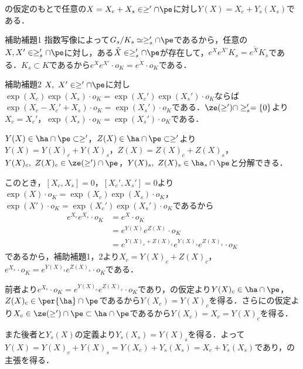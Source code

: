 \begin{lem}\label{lem:0117-decomp}
  の仮定のもとで任意の$X = X_c + X_s \in \ge'\cap\pe $に対し$Y(X) = X_c + Y_s(X_s) $である．
\end{lem}
\begin{npfwn}

  \leavevmode
  \begin{itembox}[l]{補助補題1}
    指数写像によって$G_s/K_s \simeq \ge_s'\cap \pe $であるから，任意の$X, X'\in \ge_{s}'\cap \pe $に対し，ある$\tilde{X}\in \ge_s'\cap \pe$が存在して，$e^{X}e^{X'}K_s = e^{\tilde{X}}K_s  $である．$K_s\subset K $であるから$e^{X}e^{X'}\cdot o_K = e^{\tilde{X}}\cdot o_K $である．
  \end{itembox}
  
  
  \begin{itembox}[l]{補助補題2}
    $X,\ X'\in \ge'\cap\pe $に対し$\exp(X_c)\exp(X_s)\cdot o_K = \exp(X_c')\exp(X_s')\cdot o_K $ならば$\exp(X_c-X_c'+X_s)\cdot o_K = \exp(X_s')\cdot o_K $である．$\ze(\ge')\cap \ge_s' = \{0\} $より$X_c = X_c' $，$\exp(X_s)\cdot o_K = \exp(X_s')\cdot o_K$である．
  \end{itembox}
  
  $Y(X)\in \ha\cap\pe\subset \ge' $，$Z(X)\in \ha\cap\pe\subset \ge' $より$Y(X) = Y(X)_c + Y(X)_s $，$Z(X) = Z(X)_c + Z(X)_s $，$Y(X)_c,\ Z(X)_c \in \ze(\ge')\cap\pe  $，$Y(X)_s,\ Z(X)_s\in \ha_s\cap\pe $と分解できる．

  このとき，$[X_c, X_s] = 0 $，$[X_c', X_s'] = 0$より$\exp(X)\cdot o_K = \exp(X_c)\exp(X_s)\cdot o_K $，$\exp(X')\cdot o_K = \exp(X_c')\exp(X_s')\cdot o_K $であるから
  \begin{align*}
    e^{X_c}e^{X_s}\cdot o_K &= e^{X}\cdot o_K \\
                            &= e^{Y(X)}e^{Z(X)}\cdot o_K\\
                            &= e^{Y(X)_c + Z(X)_c}e^{Y(X)_s}e^{Z(X)_s}\cdot o_K
  \end{align*}
  であるから，補助補題1，2より$X_c = Y(X)_c + Z(X)_c $，$e^{X_s}\cdot o_K = e^{Y(X)_s}e^{Z(X)_s}\cdot o_K $である．

  前者より$e^{X_c} \cdot o_K = e^{Y(X)_c}e^{Z(X)_c}\cdot o_K $であり，の仮定より$Y(X)_c \in \ha\cap \pe$，$  Z(X)_c \in \per{\ha}\cap \pe$であるから$Y(X_c) = Y(X)_c $を得る．さらにの仮定より$X_c\in \ze(\ge')\cap \pe\subset \ha \cap \pe $であるから$Y(X_c) = X_c = Y(X)_c $を得る．

  また後者と$Y_s(X) $の定義より$Y_s(X_s) = Y(X)_s $を得る．よって$Y(X) = Y(X)_c + Y(X)_s = Y(X_c) + Y_s(X_s) = X_c + Y_s(X_s) $であり，の主張を得る．  
\end{npfwn}

